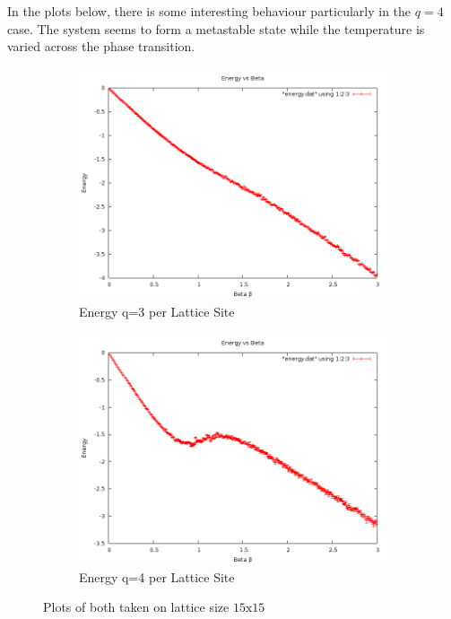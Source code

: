 \documentclass[10pt,a4paper]{article}
\begin{document}
In the plots below, there is some interesting behaviour particularly in the $q=4$ case.
The system seems to form a metastable state while the temperature is varied across the phase transition.
\begin{figure}[H]
\centering
	\begin{subfigure}[b]{0.4\textwidth}
		\includegraphics[width=\textwidth]{q=3energyvsbeta.png}	
		\caption{Energy q=3 per Lattice Site}
	\end{subfigure}
	\begin{subfigure}[b]{0.4\textwidth}
		\includegraphics[width=\textwidth]{q=4energyvsbeta.png}
		\caption{Energy q=4 per Lattice Site}
	\end{subfigure}

\caption{Plots of both taken on lattice size $15 \textrm{x} 15$}
\end{figure}
\end{document}
